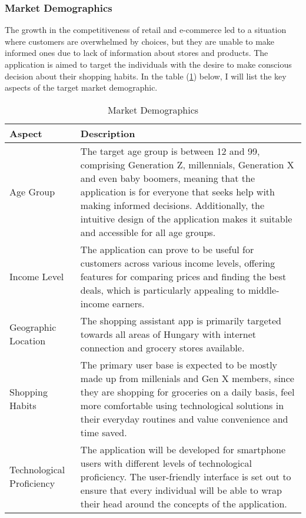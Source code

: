 \subsubsection{Market Demographics}

The growth in the competitiveness of retail and e-commerce led to a situation where customers are overwhelmed by choices, but they are unable to make informed ones due to lack of information about stores and products. The application is aimed to target the individuals with the desire to make conscious decision about their shopping habits. In the table (\ref{tab:md}) below, I will list the key aspects of the target market demographic.

\begin{table}[h]
	\centering
	\begin{tabularx}{\textwidth}{|p{3cm}|X|}
		\hline
		\textbf{Aspect} & \textbf{Description} \\
		\hline
		Age Group & The target age group is between 12 and 99, comprising Generation Z, millennials, Generation X and even baby boomers, meaning that the application is for everyone that seeks help with making informed decisions. Additionally, the intuitive design of the application makes it suitable and accessible for all age groups. \\
		\hline
		Income Level & The application can prove to be useful for customers across various income levels, offering features for comparing prices and finding the best deals, which is particularly appealing to middle-income earners. \\
		\hline
		Geographic Location & The shopping assistant app is primarily targeted towards all areas of Hungary with internet connection and grocery stores available. \\
		\hline
		Shopping Habits & The primary user base is expected to be mostly made up from millenials and Gen X members, since they are shopping for groceries on a daily basis, feel more comfortable using technological solutions in their everyday routines and value convenience and time saved. \\
		\hline
		Technological Proficiency & The application will be developed for smartphone users with different levels of technological proficiency. The user-friendly interface is set out to ensure that every individual will be able to wrap their head around the concepts of the application.\\
		\hline
	\end{tabularx}
	\caption{Market Demographics}
	\label{tab:md}
\end{table}

